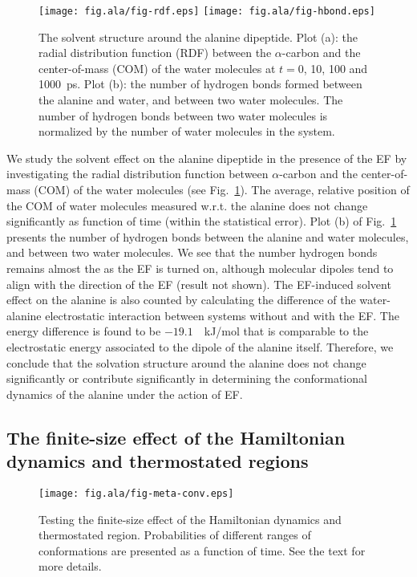 \documentclass[a4paper,preprint,unsortedaddress,onecolumn]{revtex4-1}
\begin{document}
\begin{figure}
  \centering
  \texttt{[image: fig.ala/fig-rdf.eps]}
  \texttt{[image: fig.ala/fig-hbond.eps]}
  \caption{The solvent structure around the alanine dipeptide.  Plot
    (a): the radial distribution function (RDF) between the
    $\alpha$-carbon and the center-of-mass (COM) of the water molecules at
    $t = 0$, 10, 100 and 1000~ps.  Plot (b): the number of hydrogen
    bonds formed between the alanine and water, and between two water
    molecules.  The number of hydrogen bonds between two water
    molecules is normalized by the number of water molecules in the
    system.}
  \label{fig:tmp7a}
\end{figure}
We study the solvent effect on the alanine dipeptide in the presence of the EF by investigating
the radial distribution function between $\alpha$-carbon and the
center-of-mass (COM) of the water molecules
(see Fig.~\ref{fig:tmp7a}). The average, relative position of the COM of water molecules measured w.r.t.
 the alanine does not change significantly as function of time (within the statistical error). Plot (b) of
Fig.~\ref{fig:tmp7a} presents the number of hydrogen bonds between the
alanine and water molecules, and between two water molecules. We see that the
number hydrogen bonds remains almost the as the EF is turned on,
although molecular dipoles tend to align with the direction of the EF (result
not shown). 
The EF-induced solvent effect on the alanine is also counted by calculating the
difference of the water-alanine electrostatic interaction 
between systems without and with the EF.
The energy difference is found to be $-19.1$~~kJ/mol that is
comparable to the electrostatic energy associated to the dipole of the alanine itself.
Therefore, we conclude that the solvation structure around the
alanine does not change significantly or contribute significantly in determining the conformational dynamics of the alanine under the action of EF.






\subsection{The finite-size effect of the Hamiltonian dynamics and thermostated regions}

\begin{figure}
  \centering
  \texttt{[image: fig.ala/fig-meta-conv.eps]}
  \caption{Testing the finite-size effect of the Hamiltonian dynamics and thermostated region.
    Probabilities of different ranges of conformations are presented as a function of time.
    See the text for more details.
  }
  \label{fig:tmp7}
\end{figure}
\end{document}

